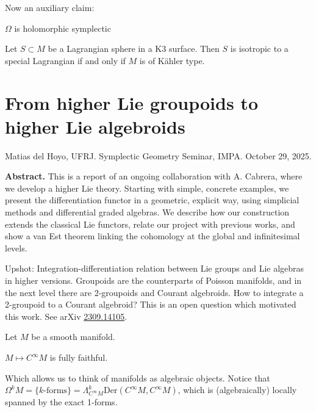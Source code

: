 \noindent
Now an auxiliary claim:

\begin{lemma}
\label{lemma-k3-type}
$\Omega$ is holomorphic symplectic
\end{lemma}

\begin{theorem}
\label{theorem-duplicate-2}
Let $S\subset M$ be a Lagrangian sphere in a
K3 surface.
Then  $S$ is isotropic to a special
Lagrangian if and only if
$M$ is of Kähler type.
\end{theorem}

\section{From higher Lie groupoids to higher
Lie algebroids}
\label{section-highe-group-highe-algeb}

\noindent
Matias del Hoyo, UFRJ.
Symplectic Geometry Seminar, IMPA.
October 29, 2025.

\medskip\noindent
{\bf Abstract.}
This is a report of an ongoing collaboration
with A. Cabrera, where we develop a
higher Lie theory. Starting with simple,
concrete examples, we present the
differentiation functor in a geometric,
explicit way, using simplicial methods
and differential graded algebras. We describe
how our construction extends the
classical Lie functors, relate our project
with previous works, and show a van
Est theorem linking the cohomology at the
global and infinitesimal levels.

\medskip\noindent

Upshot: Integration-differentiation relation
between Lie groups and Lie algebras
in higher versions. Groupoids are the
counterparts of Poisson manifolds, and in
the next level there are 2-groupoids and
Courant algebroids. How to integrate a
2-groupoid to a Courant algebroid? This is an
open question which motivated this
work. See arXiv
\href{http://arxiv.org/abs/2309.14105}%
{2309.14105}.

\medskip\noindent
Let $M$ be a smooth manifold.

\begin{remark}
\label{remark-smoot-funct-ring-fully-faith}
$M \mapsto C^\infty M$ is fully faithful.
\end{remark}

\noindent
Which allows us to think of manifolds as
algebraic objects.
Notice that
$\Omega^kM=\{k\text{-forms}\}
=\Lambda^k_{C^\infty M}\text{Der}(C^\infty
M,C^\infty M)$,
which is (algebraically) locally spanned
by the exact 1-forms.

